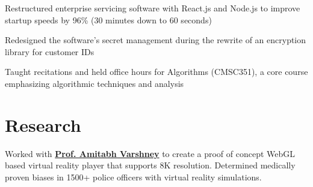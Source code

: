\documentclass[]{deedy-resume}
\begin{document}
\begin{minipage}[t]{0.66\textwidth}
\begin{tightemize}
\item Restructured enterprise servicing software with React.js and Node.js to improve startup speeds by 96\% (30 minutes down to 60 seconds)
\item Redesigned the software's secret management during the rewrite of an encryption library for customer IDs
\end{tightemize}
\sectionsep %

\begin{tightemize}
\item Taught recitations and held office hours for Algorithms (CMSC351), a core course emphasizing algorithmic techniques and analysis
\end{tightemize}
\sectionsep %


\section{Research}
Worked with \textbf{\href{https://www.cs.umd.edu/~varshney/}{Prof. Amitabh Varshney}} to create a proof of concept WebGL based virtual reality player that supports 8K resolution. Determined medically proven biases in 1500+ police officers with virtual reality simulations.
\sectionsep %


\end{minipage}
\end{document}
